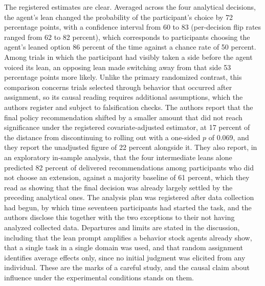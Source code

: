 \documentclass[11pt]{article}
\begin{document}
The registered estimates are clear. Averaged across the four analytical decisions, the agent's lean changed the probability of the participant's choice by 72 percentage points, with a confidence interval from 60 to 83 (per-decision flip rates ranged from 62 to 82 percent), which corresponds to participants choosing the agent's leaned option 86 percent of the time against a chance rate of 50 percent. Among trials in which the participant had visibly taken a side before the agent voiced its lean, an opposing lean made switching away from that side 53 percentage points more likely. Unlike the primary randomized contrast, this comparison concerns trials selected through behavior that occurred after assignment, so its causal reading requires additional assumptions, which the authors register and subject to falsification checks. The authors report that the final policy recommendation shifted by a smaller amount that did not reach significance under the registered covariate-adjusted estimator, at 17 percent of the distance from discontinuing to rolling out with a one-sided $p$ of 0.069, and they report the unadjusted figure of 22 percent alongside it. They also report, in an exploratory in-sample analysis, that the four intermediate leans alone predicted 82 percent of delivered recommendations among participants who did not choose an extension, against a majority baseline of 61 percent, which they read as showing that the final decision was already largely settled by the preceding analytical ones. The analysis plan was registered after data collection had begun, by which time seventeen participants had started the task, and the authors disclose this together with the two exceptions to their not having analyzed collected data. Departures and limits are stated in the discussion, including that the lean prompt amplifies a behavior stock agents already show, that a single task in a single domain was used, and that random assignment identifies average effects only, since no initial judgment was elicited from any individual. These are the marks of a careful study, and the causal claim about influence under the experimental conditions stands on them.
\end{document}
